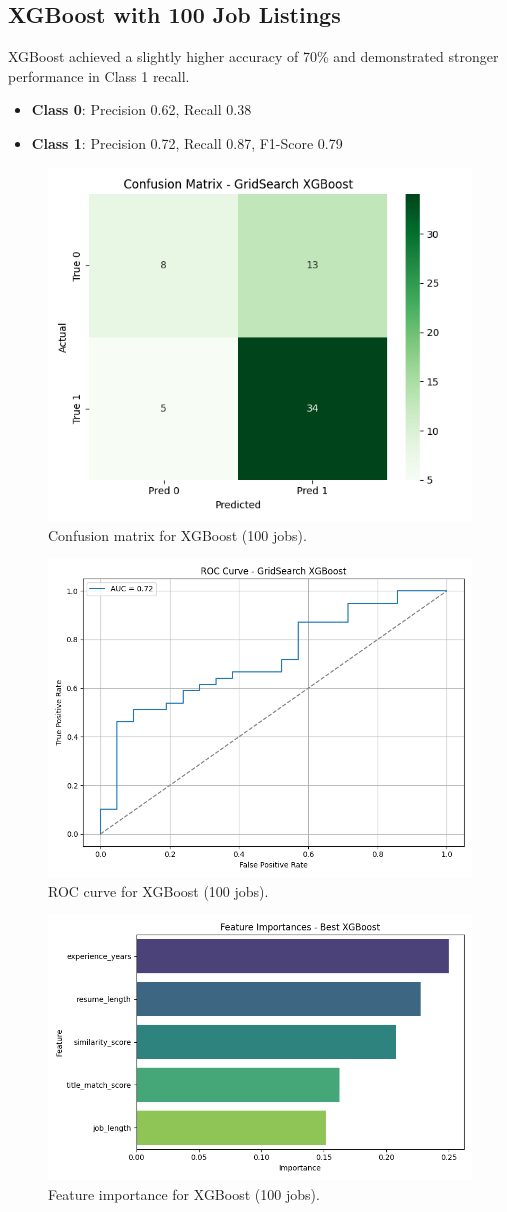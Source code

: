 \documentclass[a4paper]{article}
\begin{document}
\begin{multicols}{2}
\subsection{XGBoost with 100 Job Listings}
XGBoost achieved a slightly higher accuracy of 70\% and demonstrated stronger performance in Class 1 recall.

\begin{itemize}
    \item \textbf{Class 0}: Precision 0.62, Recall 0.38
    \item \textbf{Class 1}: Precision 0.72, Recall 0.87, F1-Score 0.79
\end{itemize}

\begin{figure}[H]
\centering
\includegraphics[width=0.45\linewidth]{Images/conf_matrix_xgb_100.png}
\caption{Confusion matrix for XGBoost (100 jobs).}
\end{figure}

\begin{figure}[H]
\centering
\includegraphics[width=0.65\linewidth]{Images/roc_xgb_100.png}
\caption{ROC curve for XGBoost (100 jobs).}
\end{figure}

\begin{figure}[H]
\centering
\includegraphics[width=0.75\linewidth]{Images/featimp_xgb_100.png}
\caption{Feature importance for XGBoost (100 jobs).}
\end{figure}


\end{multicols}
\end{document}
